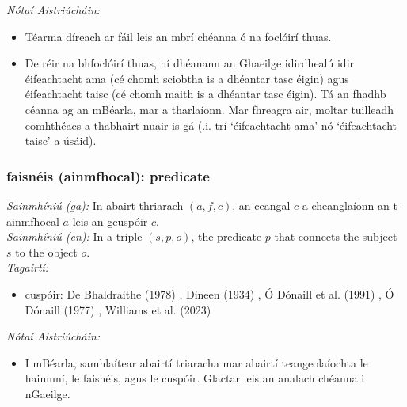  \noindent \textit{Nótaí Aistriúcháin:}
\begin{itemize}
	\item Téarma díreach ar fáil leis an mbrí chéanna ó na foclóirí thuas.
	\item De réir na bhfoclóirí thuas, ní dhéanann an Ghaeilge idirdhealú idir éifeachtacht ama (cé chomh sciobtha is a dhéantar tasc éigin) agus éifeachtacht taisc (cé chomh maith is a dhéantar tasc éigin). Tá an fhadhb céanna ag an mBéarla, mar a tharlaíonn. Mar fhreagra air, moltar tuilleadh comhthéacs a thabhairt nuair is gá (.i. trí `éifeachtacht ama' nó `éifeachtacht taisc' a úsáid).
\end{itemize}


\subsubsection*{faisnéis (ainmfhocal): predicate}
 \noindent \textit{Sainmhíniú (ga):} In abairt thriarach $(a,f,c)$, an ceangal $c$ a cheanglaíonn an t-ainmfhocal $a$ leis an gcuspóir $c$.
\\
 \noindent \textit{Sainmhíniú (en):} In a triple $(s,p,o)$, the predicate $p$ that connects the subject $s$ to the object $o$.
\\
 \noindent \textit{Tagairtí:}
\begin{itemize}
	\item cuspóir: De Bhaldraithe (1978) \cite{de-bhaldraithe}, Dineen (1934) \cite{dineen}, Ó Dónaill et al. (1991) \cite{focloir-beag}, Ó Dónaill (1977) \cite{odonaill}, Williams et al. (2023) \cite{storchiste}
\end{itemize}

 \noindent \textit{Nótaí Aistriúcháin:}
\begin{itemize}
	\item I mBéarla, samhlaítear abairtí triaracha mar abairtí teangeolaíochta le hainmní, le faisnéis, agus le cuspóir. Glactar leis an analach chéanna i nGaeilge.
\end{itemize}


